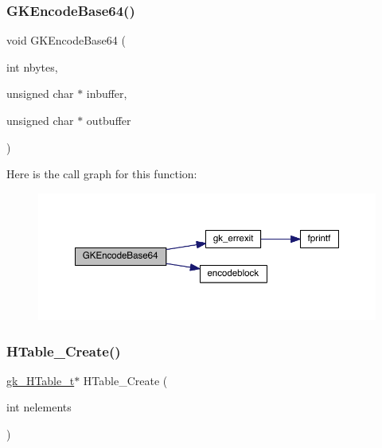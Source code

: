 \subsubsection{\texorpdfstring{G\+K\+Encode\+Base64()}{GKEncodeBase64()}}
{\footnotesize\ttfamily void G\+K\+Encode\+Base64 (\begin{DoxyParamCaption}\item[{int}]{nbytes,  }\item[{unsigned char $\ast$}]{inbuffer,  }\item[{unsigned char $\ast$}]{outbuffer }\end{DoxyParamCaption})}

Here is the call graph for this function\+:\nopagebreak
\begin{figure}[H]
\begin{center}
\leavevmode
\includegraphics[width=350pt]{a00077_a63253b29fd38d41463013481ce7e7f0a_cgraph}
\end{center}
\end{figure}
\mbox{\label{a00077_a8dc2b324b10c45883dacbf58ac0b7efd}} 
\subsubsection{\texorpdfstring{H\+Table\+\_\+\+Create()}{HTable\_Create()}}
{\footnotesize\ttfamily \hyperlink{a00650}{gk\+\_\+\+H\+Table\+\_\+t}$\ast$ H\+Table\+\_\+\+Create (\begin{DoxyParamCaption}\item[{int}]{nelements }\end{DoxyParamCaption})}

